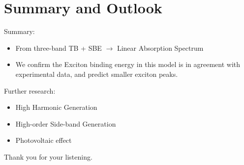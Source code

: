 \documentclass{beamer}
\begin{document}
	\section{Summary and Outlook}
	\begin{frame}
	\begin{block}{Summary:}
\begin{itemize}
\item From three-band TB + SBE $\to $ Linear Absorption Spectrum
\item We confirm the Exciton binding energy in this model is in agreement with experimental data, and predict smaller exciton peaks.
\end{itemize}
	\end{block}
	\begin{exampleblock}{Further research:}
	\begin{itemize}
		\item High Harmonic Generation
		\item High-order Side-band Generation
		\item Photovoltaic effect
	\end{itemize}
\end{exampleblock}
	\begin{center}
		Thank you for your listening.
	\end{center}
	\end{frame}
\end{document}
